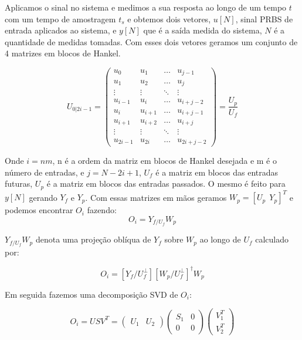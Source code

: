 Aplicamos o sinal no sistema e medimos a sua resposta ao longo de um tempo $t$ com um tempo de amostragem $t_s$ e obtemos dois vetores, $u[N]$, sinal PRBS de entrada aplicados ao sistema, e $y[N]$ que é a saída medida do sistema, $N$ é a quantidade de medidas tomadas. Com esses dois vetores geramos um conjunto de 4 matrizes em blocos de Hankel.

\begin{equation}\label{eq:matrizhankel}
U_{0|2i-1}=
\begin{pmatrix}
u_0 & u_1 & \dots & u_{j-1} \\
u_1 & u_2 & \dots & u_{j} \\
\vdots & \vdots & \ddots & \vdots\\
u_{i-1} & u_i & \dots & u_{i+j-2}\\
\hline
u_i & u_{i+1} & \dots & u_{i+j-1}\\
u_{i+1} & u_{i+2} & \dots & u_{i+j}\\
\vdots & \vdots & \ddots & \vdots\\
u_{2i-1} & u_{2i} & \dots & u_{2i+j-2}
\end{pmatrix}
=\dfrac{U_p}{U_f}
\end{equation}

Onde $i=nm$, n é a ordem da matriz em blocos de Hankel desejada e m é o número de entradas, e $j=N-2i+1$, $U_f$ é a matriz em blocos das entradas futuras, $U_p$ é a matriz em blocos das entradas passados. O mesmo é feito para $y[N]$ gerando $Y_f$ e $Y_p$. Com essas matrizes em mãos geramos $W_p=[U_p~~Y_p]^T$ e podemos encontrar $O_i$ fazendo:
\begin{equation}\label{eq:oi}
O_i=Y_{f/U_f} W_p
\end{equation}

$Y_{f/U_f}W_p$ denota uma projeção oblíqua de $Y_f$ sobre $W_p$ ao longo de $U_f$ calculado por:

\begin{equation}\label{eq:oiexp}
O_i=[Y_f/U_f^\perp][W_p/U_f^\perp]^\dagger W_p
\end{equation}

Em seguida fazemos uma decomposição SVD de $O_i$:

\begin{equation}\label{eq:svd}
O_i=USV^T=\begin{pmatrix}
U_1 &U_2
\end{pmatrix}\begin{pmatrix}
S_1 & 0\\ 0 & 0
\end{pmatrix} 
\begin{pmatrix}
V_1^T \\ V_2^T
\end{pmatrix}
\end{equation}

